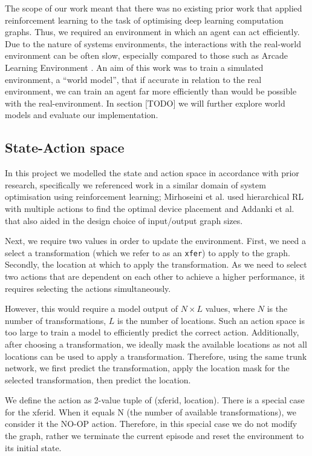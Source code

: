 The scope of our work meant that there was no existing prior work that applied reinforcement learning to the task of optimising deep learning computation graphs. Thus, we required an environment in which an agent can act efficiently. Due to the nature of systems environments, the interactions with the real-world environment can be often slow, especially compared to those such as Arcade Learning Environment \cite{Bellemare_2013}. An aim of this work was to train a simulated environment, a ``world model'', that if accurate in relation to the real environment, we can train an agent far more efficiently than would be possible with the real-environment. In section [TODO] we will further explore world models and evaluate our implementation.

\subsection{State-Action space}
In this project we modelled the state and action space in accordance with prior research, specifically we referenced work in a similar domain of system optimisation using reinforcement learning; Mirhoseini et al. \cite{mirhoseini2018hierarchical} used hierarchical RL with multiple actions to find the optimal device placement and Addanki et al. \cite{addanki2019placeto} that also aided in the design choice of input/output graph sizes.

Next, we require two values in order to update the environment. First, we need a select a transformation (which we refer to as an \texttt{xfer}) to apply to the graph. Secondly, the location at which to apply the transformation. As we need to select two actions that are dependent on each other to achieve a higher performance, it requires selecting the actions simultaneously.

However, this would require a model output of $N \times L$ values, where $N$ is the number of transformations, $L$ is the number of locations. Such an action space is too large to train a model to efficiently predict the correct action. Additionally, after choosing a transformation, we ideally mask the available locations as not all locations can be used to apply a transformation. Therefore, using the same trunk network, we first predict the transformation, apply the location mask for the selected transformation, then predict the location.

We define the action as 2-value tuple of (xfer\textunderscore id, location). There is a special case for the xfer\textunderscore id. When it equals N (the number of available transformations), we consider it the NO-OP action. Therefore, in this special case we do not modify the graph, rather we terminate the current episode and reset the environment to its initial state.

